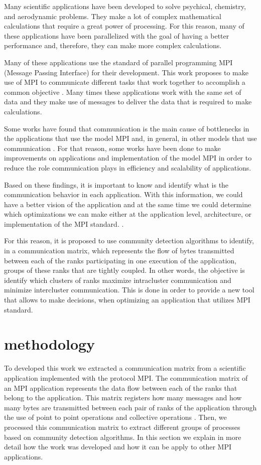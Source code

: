 \documentclass[journal]{IEEEtran}
\begin{document}
\begin{NoHyper}
Many scientific applications have been developed to solve psychical, chemistry, and aerodynamic problems. They make a lot of complex mathematical calculations that require a great power of processing. For this reason, many of these applications have been parallelized with the goal of having a better performance and, therefore, they can make more complex calculations. 

Many of these applications use the standard of parallel programming MPI (Message Passing Interface) for their development. This work proposes to make use of MPI to communicate different tasks that work together to accomplish a common objective \cite{mpi}. Many times these applications work with the same set of data and they make use of messages to deliver the data that is required to make calculations.

Some works have found that communication is the main cause of bottlenecks in the applications that use the model MPI and, in general, in other models that use communication \cite{Aleksandr,Jain,ShiGang}. For that reason, some works have been done to make improvements on applications and implementation of the model MPI in order to reduce the role communication plays in efficiency and scalability
of applications.

Based on these findings, it is important to know and identify what is the communication behavior in each application. With this information, we could have a better vision of the application and at the same time we could determine which optimizations we can make either at the application level, architecture, or implementation of the MPI standard. \cite{mpi}.

For this reason, it is proposed to use community detection algorithms to identify, in a communication matrix, which represents the flow of bytes transmitted between each of the ranks participating in one execution of the application, groups of these ranks that are tightly coupled. In other words, the objective is identify which clusters of ranks maximize intracluster communication and minimize intercluster communication. This is done in order to provide a new tool that allows to make decisions, when optimizing an application that utilizes MPI standard.

\section{methodology}

To developed this work we extracted a communication matrix from a scientific application implemented with the protocol MPI. The communication matrix of an MPI application represents the data flow between each of the ranks that belong to the application. This matrix registers how many messages and how many bytes are transmitted between each pair of ranks of the application through the use of point to point operations and collective operations \cite{Roth,Meneses,Mazaheri}. Then, we processed this communication matrix to extract different groups of processes based on community detection algorithms. In this section we explain in more detail how the work was developed and how it can be apply to other MPI applications.


\end{NoHyper}
\end{document}

